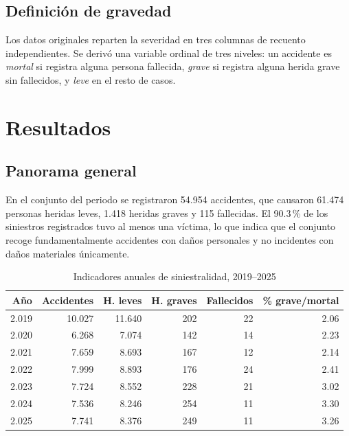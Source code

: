 \documentclass[11pt,a4paper]{article}\usepackage[]{graphicx}\usepackage[]{xcolor}
\begin{document}
\subsection{Definición de gravedad}

Los datos originales reparten la severidad en tres columnas de recuento
independientes. Se derivó una variable ordinal de tres
niveles: un accidente es \textit{mortal} si registra alguna persona
fallecida, \textit{grave} si registra alguna herida grave sin fallecidos,
y \textit{leve} en el resto de casos.

\section{Resultados}

\subsection{Panorama general}

En el conjunto del periodo se registraron 54.954 accidentes,
que causaron 61.474 personas heridas leves,
1.418 heridas graves y 115 fallecidas. El
90.3\,\% de los siniestros registrados tuvo al
menos una víctima, lo que indica que el conjunto recoge fundamentalmente
accidentes con daños personales y no incidentes con daños materiales
únicamente.

\begin{table}

\caption{\label{tab:tabla-anual}Indicadores anuales de siniestralidad, 2019--2025}
\centering
\begin{tabular}[t]{rrrrrr}
\toprule
Año & Accidentes & H. leves & H. graves & Fallecidos & \% grave/mortal\\
\midrule
2.019 & 10.027 & 11.640 & 202 & 22 & 2.06\\
2.020 & 6.268 & 7.074 & 142 & 14 & 2.23\\
2.021 & 7.659 & 8.693 & 167 & 12 & 2.14\\
2.022 & 7.999 & 8.893 & 176 & 24 & 2.41\\
2.023 & 7.724 & 8.552 & 228 & 21 & 3.02\\
2.024 & 7.536 & 8.246 & 254 & 11 & 3.30\\
2.025 & 7.741 & 8.376 & 249 & 11 & 3.26\\
\bottomrule
\end{tabular}
\end{table}
\end{document}
